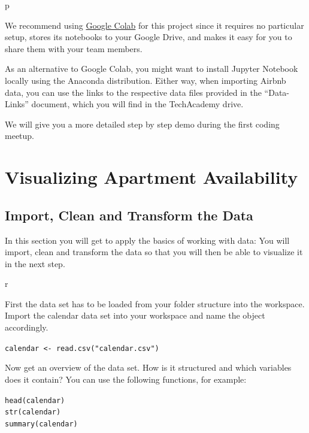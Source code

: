 \documentclass[
  11pt,
]{book}
\begin{document}
\begin{tipsp}p

We recommend using \href{https://colab.research.google.com}{Google
Colab} for this project since it requires no particular setup, stores
its notebooks to your Google Drive, and makes it easy for you to share
them with your team members.

As an alternative to Google Colab, you might want to install Jupyter
Notebook locally using the Anaconda distribution. Either way, when
importing Airbnb data, you can use the links to the respective data
files provided in the ``Data-Links'' document, which you will find in
the TechAcademy drive.

We will give you a more detailed step by step demo during the first
coding meetup.

\end{tipsp}

\hypertarget{visualizing-apartment-availability}{%
\section{Visualizing Apartment
Availability}\label{visualizing-apartment-availability}}

\hypertarget{import-clean-and-transform-the-data}{%
\subsection{Import, Clean and Transform the
Data}\label{import-clean-and-transform-the-data}}

In this section you will get to apply the basics of working with data:
You will import, clean and transform the data so that you will then be
able to visualize it in the next step.

\begin{tips}r

First the data set has to be loaded from your folder structure into the
workspace. Import the calendar data set into your workspace and name the
object accordingly.

\texttt{calendar\ \textless{}-\ read.csv("calendar.csv")}

Now get an overview of the data set. How is it structured and which
variables does it contain? You can use the following functions, for
example:

\texttt{head(calendar)}~\\
\texttt{str(calendar)}~\\
\texttt{summary(calendar)}

\end{tips}
\end{document}
